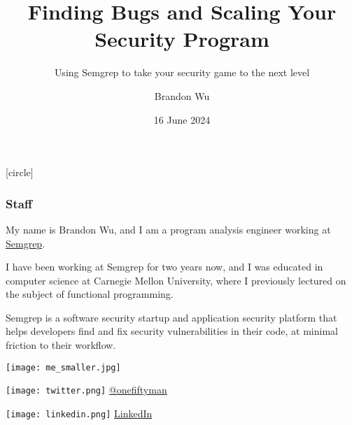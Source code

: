 \documentclass[aspectratio=169, handout]{beamer}
\title{Finding Bugs and Scaling Your Security Program} %
\subtitle{Using Semgrep to take your security game to the next level} %
\date{16 June 2024} %
\author{Brandon Wu} %
\newif\ifcolorlambda
\begin{document}
\ifweb
    \renewcommand{\pause}{}
\fi

[circle]






\begin{frame}[fragile]
  \frametitle{Staff}

  \begin{center}
    \begin{minipage}{0.65\textwidth}
      My name is Brandon Wu, and I am a program analysis engineer working at {\color{semgrepGreen}\href{https://semgrep.dev/}{Semgrep}}.

      \vspace{10pt}

      I have been working at Semgrep for two years now, and I was educated in computer science
      at Carnegie Mellon University, where I previously lectured on the subject of functional
      programming.

      \vspace{10pt}

      Semgrep is a software security startup and application security platform that
      helps developers find and fix security vulnerabilities in their code, at minimal
      friction to their workflow.
    \end{minipage}
    \hspace{\fill}
    \begin{minipage}{0.30\textwidth}
      \begin{center}
        \texttt{[image: me\_smaller.jpg]}

        \vspace{5pt}

        \texttt{[image: twitter.png]}
        {\color{blue}\href{https://twitter.com/onefiftyman}{@onefiftyman}}

        \vspace{5pt}

        \texttt{[image: linkedin.png]}
        {\color{blue}\href{https://www.linkedin.com/in/brandon-wu-79935116b/}{LinkedIn}}

      \end{center}
    \end{minipage}
  \end{center}
\end{frame}
\end{document}
